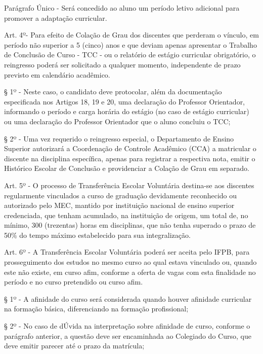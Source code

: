 Parágrafo Único - Será concedido ao aluno um período letivo adicional para promover a adaptação curricular.

\vspace{1mm}
Art. 4º- Para efeito de Colação de Grau dos discentes que perderam o vínculo, em período não superior a 5 (cinco) anos e que deviam apenas apresentar o Trabalho de Conclusão de Curso - TCC - ou o relatório de estágio curricular obrigatório, o reingresso poderá ser solicitado a qualquer momento, independente de prazo previsto em calendário acadêmico.

	§ 1º - Neste caso, o candidato deve protocolar, além da documentação especificada nos Artigos 18, 19 e 20, uma declaração do Professor Orientador, informando o período e carga horária do estágio (no caso de estágio curricular) ou uma declaração do Professor Orientador que o aluno concluiu o TCC;

	§ 2º - Uma vez requerido o reingresso especial, o Departamento de Ensino Superior autorizará a Coordenação de Controle Acadêmico (CCA) a matricular o discente na disciplina específica, apenas para registrar a respectiva nota, emitir o Histórico Escolar de Conclusão e providenciar a Colação de Grau em separado.

\vspace{1mm}
Art. 5º - O processo de Transferência Escolar Voluntária destina-se aos discentes regularmente vinculados a curso de graduação devidamente reconhecido ou autorizado pelo MEC, mantido por instituição nacional de ensino superior credenciada, que tenham acumulado, na instituição de origem, um total de, no mínimo, 300 (trezentas) horas em disciplinas, que não tenha superado o prazo de 50\% do tempo máximo estabelecido para sua integralização.

\vspace{1mm}
Art. 6º - A Transferência Escolar Voluntária poderá ser aceita pelo IFPB, para prosseguimento dos estudos no mesmo curso ao qual estava vinculado ou, quando este não existe, em curso afim, conforme a oferta de vagas com esta finalidade no período e no curso pretendido ou curso afim.

§ 1º - A afinidade do curso será considerada quando houver afinidade curricular na formação básica, diferenciando na formação profissional;

§ 2º - No caso de dÚvida na interpretação sobre afinidade de curso, conforme o parágrafo anterior, a questão deve ser encaminhada ao Colegiado do Curso, que deve emitir parecer até o prazo da matrícula;


